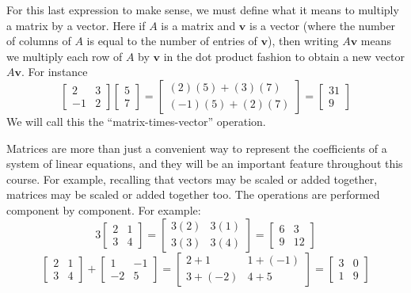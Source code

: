 \documentclass[11pt,oneside]{amsbook}
\theoremstyle{definition}
\theoremstyle{plain}
\theoremstyle{definition}
\theoremstyle{remark}
\numberwithin{equation}{section}
\numberwithin{figure}{section}
\begin{document}
For this last expression to make sense, we must define what it means to multiply a matrix by a vector. Here if $A$ is a matrix and $\mathbf{v}$ is a vector (where the number of columns of $A$ is equal to the number of entries of $\mathbf{v}$), then writing $A\mathbf{v}$ means we multiply each row of $A$ by  $\mathbf{v}$ in the dot product fashion to obtain a new vector $A\mathbf{v}$. For instance
\[\begin{bmatrix}2&3\\-1&2\end{bmatrix}
  \begin{bmatrix}5\\7\end{bmatrix}
  =\begin{bmatrix}(2)(5)+(3)(7)\\(-1)(5)+(2)(7)\end{bmatrix}
  =\begin{bmatrix}31\\9\end{bmatrix}
\]
We will call this the ``matrix-times-vector'' operation.

Matrices are more than just a convenient way to represent the coefficients of a system of linear equations, and they will be an important feature throughout this course. For example, recalling that vectors may be scaled or added together, matrices may be scaled or added together too. The operations are performed component by component. For example:
\[3\begin{bmatrix}2&1\\3&4\end{bmatrix}
  =\begin{bmatrix}3(2)&3(1)\\3(3)&3(4)\end{bmatrix}
  =\begin{bmatrix}6&3\\9&12\end{bmatrix}
\]
\[\begin{bmatrix}2&1\\3&4\end{bmatrix}
  +\begin{bmatrix}1&-1\\-2&5\end{bmatrix}
  =\begin{bmatrix}2+1&1+(-1)\\3+(-2)&4+5\end{bmatrix}
  =\begin{bmatrix}3&0\\1&9\end{bmatrix}
\]
\end{document}
